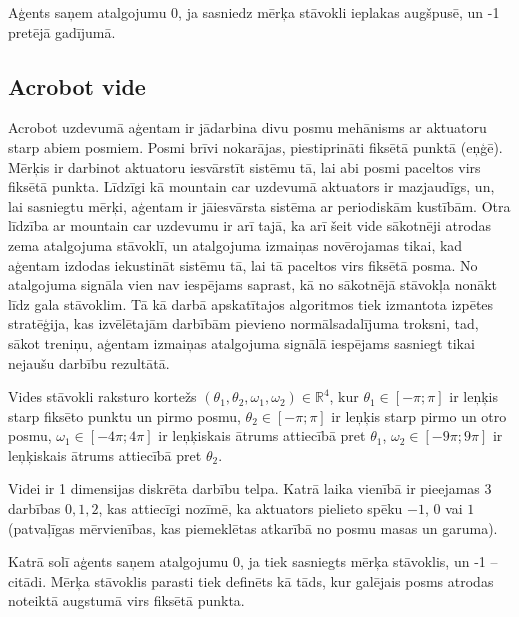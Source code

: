 \documentclass{ludis} %
\begin{document}
Aģents saņem atalgojumu 0, ja sasniedz mērķa stāvokli ieplakas augšpusē, un
-1 pretējā gadījumā.

\subsection{Acrobot vide}
Acrobot uzdevumā aģentam ir jādarbina divu posmu mehānisms ar aktuatoru starp
abiem posmiem. Posmi brīvi nokarājas, piestiprināti fiksētā punktā (eņģē).
Mērķis ir darbinot aktuatoru iesvārstīt sistēmu tā, lai abi posmi paceltos virs
fiksētā punkta. Līdzīgi kā mountain car uzdevumā aktuators ir mazjaudīgs, un,
lai sasniegtu mērķi, aģentam ir jāiesvārsta sistēma ar periodiskām kustībām.
Otra līdzība ar mountain car uzdevumu ir arī tajā, ka arī šeit vide sākotnēji
atrodas zema atalgojuma stāvoklī, un atalgojuma izmaiņas novērojamas tikai, kad
aģentam izdodas iekustināt sistēmu tā, lai tā paceltos virs fiksētā posma.
No atalgojuma signāla vien nav iespējams saprast, kā no sākotnējā stāvokļa
nonākt līdz gala stāvoklim. Tā kā darbā apskatītajos algoritmos tiek izmantota
izpētes stratēģija, kas izvēlētajām darbībām pievieno normālsadalījuma troksni,
tad, sākot treniņu, aģentam izmaiņas atalgojuma signālā iespējams sasniegt tikai
nejaušu darbību rezultātā.

Vides stāvokli raksturo kortežs $(\theta_1, \theta_2, \omega_1, \omega_2) \in
\mathbb{R}^4$, kur $\theta_1 \in [-\pi; \pi]$ ir leņķis starp fiksēto punktu un
pirmo posmu, $\theta_2 \in [-\pi; \pi]$ ir leņķis starp pirmo un otro posmu,
$\omega_1 \in [-4\pi; 4\pi]$ ir leņķiskais ātrums attiecībā pret $\theta_1$,
$\omega_2 \in [-9\pi; 9\pi]$ ir leņķiskais ātrums attiecībā pret $\theta_2$.

Videi ir 1 dimensijas diskrēta darbību telpa. Katrā laika vienībā ir pieejamas 3
darbības ${0, 1, 2}$, kas attiecīgi nozīmē, ka aktuators pielieto spēku $-1$,
$0$ vai $1$ (patvaļīgas mērvienības, kas piemeklētas atkarībā no posmu masas un
garuma).

Katrā solī aģents saņem atalgojumu 0, ja tiek sasniegts mērķa stāvoklis, un -1
-- citādi. Mērķa stāvoklis parasti tiek definēts kā tāds, kur galējais posms atrodas
noteiktā augstumā virs fiksētā punkta.


\end{document}

